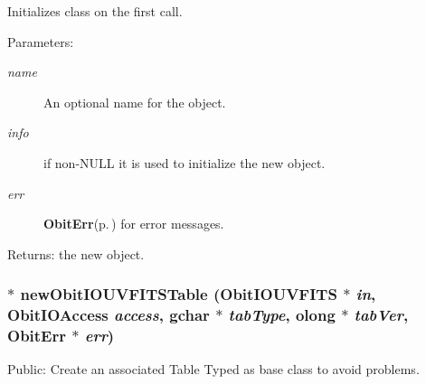 Initializes class on the first call. \begin{Desc}
\item[Parameters:]
\begin{description}
\item[{\em name}]An optional name for the object. \item[{\em info}]if non-NULL it is used to initialize the new object. \item[{\em err}]{\bf Obit\-Err}{\rm (p.\,\pageref{structObitErr})} for error messages. \end{description}
\end{Desc}
\begin{Desc}
\item[Returns:]the new object. \end{Desc}
\subsubsection{$\ast$ new\-Obit\-IOUVFITSTable ({\bf Obit\-IOUVFITS} $\ast$ {\em in}, Obit\-IOAccess {\em access}, gchar $\ast$ {\em tab\-Type}, {\bf olong} $\ast$ {\em tab\-Ver}, {\bf Obit\-Err} $\ast$ {\em err})}\label{ObitIOUVFITS_8c_a38}


Public: Create an associated Table Typed as base class to avoid problems. 

